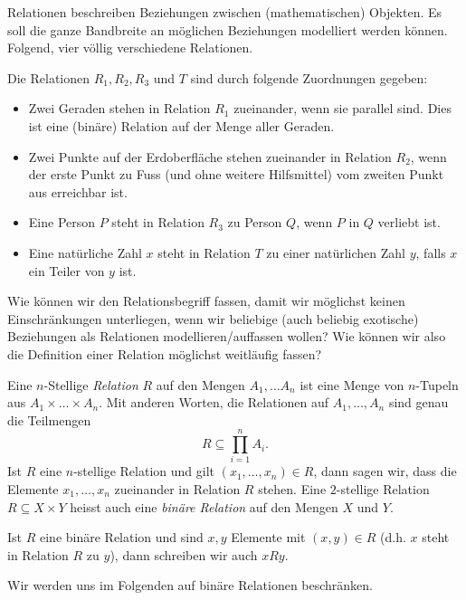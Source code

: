 Relationen beschreiben Beziehungen zwischen (mathematischen) Objekten. Es soll die ganze Bandbreite an möglichen Beziehungen modelliert werden können. Folgend, vier völlig verschiedene Relationen.
\begin{bsp}
Die Relationen $R_1,R_2,R_3$ und $T$ sind durch folgende Zuordnungen gegeben:
\begin{itemize}
\item Zwei Geraden stehen in Relation $R_1$ zueinander, wenn sie parallel sind. Dies ist eine (binäre) Relation auf der Menge aller Geraden.
\item Zwei Punkte auf der Erdoberfläche stehen zueinander in Relation $R_2$, wenn der erste Punkt zu Fuss (und ohne weitere Hilfsmittel) vom zweiten Punkt aus erreichbar ist.
\item Eine Person $P$ steht in Relation $R_3$ zu Person $Q$, wenn $P$ in $Q$ verliebt ist.
\item Eine natürliche Zahl $x$ steht in Relation $T$ zu einer natürlichen Zahl $y$, falls $x$ ein Teiler von $y$ ist.
\end{itemize}
\end{bsp}

Wie können wir den Relationsbegriff fassen, damit wir möglichst keinen Einschränkungen unterliegen, wenn wir beliebige (auch beliebig exotische) Beziehungen als Relationen modellieren/auffassen wollen? Wie können wir also die Definition einer Relation möglichst weitläufig fassen?

\begin{df}
Eine $n$-Stellige \textit{Relation} $R$ auf den Mengen $A_1,\dots A_n$ ist eine Menge von $n$-Tupeln aus $A_1\times\dots \times A_n$. Mit anderen Worten, die Relationen auf $A_1,\dots,A_n$ sind genau die Teilmengen
\[
R\subseteq \prod_{i=1}^nA_i.
\]
Ist $R$ eine $n$-stellige Relation und gilt $(x_1,\dots,x_n)\in R$, dann sagen wir, dass die Elemente $x_1,\dots,x_n$ zueinander in Relation $R$ stehen.
Eine $2$-stellige Relation $R\subseteq X\times Y$ heisst auch eine \textit{binäre Relation} auf den Mengen $X$ und $Y$.
\end{df}

\begin{ntt}
Ist $R$ eine binäre Relation und sind $x,y$ Elemente mit $(x,y)\in R$ (d.h. $x$ steht in Relation $R$ zu $y$), dann schreiben wir auch $xRy$.
\end{ntt}

Wir werden uns im Folgenden auf binäre Relationen beschränken.


